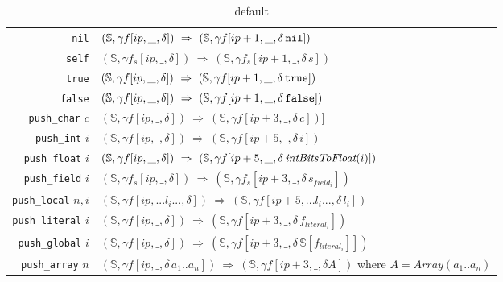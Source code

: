 \documentclass[11pt]{article}
\begin{document}
\begin{table}[tbp]
\caption{default}
\begin{center}
\begin{tabular}{|r|l|}
\hline
{\tt nil}  & $(\mathbb{S}, \gamma f[ip,\_,\delta]) ~\Rightarrow~ (\mathbb{S}, \gamma f[ip+1,\_,\delta\, \text{\tt nil}])$\\

{\tt self} & $(\mathbb{S},\gamma f_s[ip,\_,\delta]) ~\Rightarrow~ (\mathbb{S},\gamma f_s[ip+1,\_,\delta \,s])$ \\

{\tt true} & $(\mathbb{S},\gamma f[ip,\_,\delta]) ~\Rightarrow~ (\mathbb{S},\gamma f[ip+1,\_,\delta \,\text{\tt true}])$\\

{\tt false} & $(\mathbb{S},\gamma f[ip,\_,\delta]) ~\Rightarrow~ (\mathbb{S},\gamma f[ip+1,\_,\delta \,\text{\tt false}])$\\

{\tt push\_char} $c$ & $(\mathbb{S},\gamma f[ip,\_,\delta]) ~\Rightarrow~ (\mathbb{S},\gamma f[ip+3,\_,\delta \,c])$]\\

{\tt push\_int} $i$ & $(\mathbb{S},\gamma f[ip,\_,\delta]) ~\Rightarrow~ (\mathbb{S},\gamma f[ip+5,\_,\delta \,i])$\\

{\tt push\_float} $i$ & $(\mathbb{S},\gamma f[ip,\_,\delta]) ~\Rightarrow~ (\mathbb{S},\gamma f[ip+5,\_,\delta \, \text{\em intBitsToFloat}(i)])$\\

{\tt push\_field} $i$ & $(\mathbb{S},\gamma f_s[ip,\_,\delta]) ~\Rightarrow~ (\mathbb{S}, \gamma f_s[ip+3,\_,\delta \,s_{field_i}])$ \\

{\tt push\_local} $n, i$ & $(\mathbb{S},\gamma f[ip,... l_i ...,\delta]) ~\Rightarrow~ (\mathbb{S},\gamma f[ip+5,...l_i...,\delta \,l_i])$\\

{\tt push\_literal} $i$ & $(\mathbb{S},\gamma f[ip,\_,\delta]) ~\Rightarrow~ (\mathbb{S},\gamma f[ip+3,\_,\delta \,f_{literal_i}])$ \\

{\tt push\_global} $i$  & $(\mathbb{S},\gamma f[ip,\_,\delta]) ~\Rightarrow~ (\mathbb{S},\gamma f[ip+3,\_,\delta \,\mathbb{S}[f_{literal_i}]])$ \\

{\tt push\_array} $n$  &  $(\mathbb{S},\gamma f[ip,\_,\delta\,a_1..a_n]) ~\Rightarrow~ (\mathbb{S}, \gamma f[ip+3,\_,\delta A])$ where $A = Array(a_1..a_n)$ \\


\end{tabular}
\end{center}
\end{table}
\end{document}
